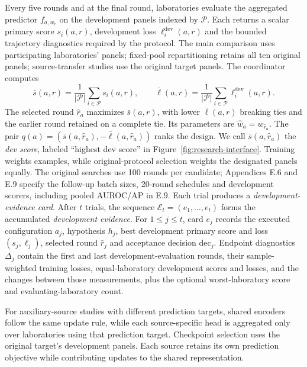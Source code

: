 Every five rounds and at the final round, laboratories evaluate the aggregated predictor $f_{a,w_r}$ on the development panels indexed by $\mathcal P$. Each returns a scalar primary score $s_i(a,r)$, development loss $\ell_i^{\mathrm{dev}}(a,r)$ and the bounded trajectory diagnostics required by the protocol. The main comparison uses participating laboratories' panels; fixed-pool repartitioning retains all ten original panels; source-transfer studies use the original target panels. The coordinator computes
\begin{equation}
\bar s(a,r)=\frac{1}{|\mathcal P|}\sum_{i\in\mathcal P}s_i(a,r),
\qquad
\bar\ell(a,r)=\frac{1}{|\mathcal P|}\sum_{i\in\mathcal P}\ell_i^{\mathrm{dev}}(a,r).
\label{eq:shared-evaluation}
\end{equation}
The selected round $\widehat r_a$ maximizes $\bar s(a,r)$, with lower $\bar\ell(a,r)$ breaking ties and the earlier round retained on a complete tie. Its parameters are $\widehat w_a=w_{\widehat r_a}$. The pair $q(a)=(\bar s(a,\widehat r_a),-\bar\ell(a,\widehat r_a))$ ranks the design. We call $\bar s(a,\widehat r_a)$ the \emph{dev score}, labeled ``highest dev score'' in Figure~\ref{fig:research-interface}. Training weights examples, while original-protocol selection weights the designated panels equally. The original searches use 100 rounds per candidate; Appendices E.6 and E.9 specify the follow-up batch sizes, 20-round schedules and development scorers, including pooled AUROC/AP in E.9.
Each trial produces a \emph{development-evidence card}. After $t$ trials, the sequence $\mathcal E_t=(e_1,\dots,e_t)$ forms the accumulated \emph{development evidence}. For $1\le j\le t$, card $e_j$ records the executed configuration $a_j$, hypothesis $h_j$, best development primary score and loss $(s_j,\ell_j)$, selected round $\widehat r_j$ and acceptance decision $\mathrm{dec}_j$. Endpoint diagnostics $\Delta_j$ contain the first and last development-evaluation rounds, their sample-weighted training losses, equal-laboratory development scores and losses, and the changes between those measurements, plus the optional worst-laboratory score and evaluating-laboratory count.

For auxiliary-source studies with different prediction targets, shared encoders follow the same update rule, while each source-specific head is aggregated only over laboratories using that prediction target. Checkpoint selection uses the original target's development panels. Each source retains its own prediction objective while contributing updates to the shared representation.

